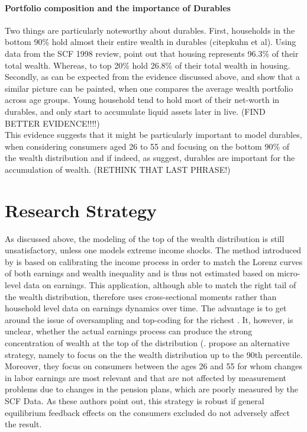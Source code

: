 \documentclass[a4paper,12pt]{article}
\begin{document}
\paragraph{Portfolio composition and the importance of Durables}
Two things are particularly noteworthy about durables. First, households in the bottom 90\% hold almost their entire wealth in durables (citep{kuhn et al}). Using data from the SCF 1998 review, \cite{diaz2010} point out that housing represents 96.3\% of their total wealth. Whereas, to top 20\% hold 26.8\% of their total wealth in housing. Secondly, as can be expected from the evidence discussed above, \cite{yang2009} and \cite{FV&K2011} show that a similar picture can be painted, when one compares the average wealth portfolio across age groups. Young household tend to hold most of their net-worth in durables, and only start to accumulate liquid assets later in live. (FIND BETTER EVIDENCE!!!!)
\\
This evidence suggests that it might be particularly important to model durables, when considering consumers aged 26 to 55 and focusing on the bottom 90\% of the wealth distribution and if indeed, as \cite{FV&K2011} suggest, durables are important for the accumulation of wealth. (RETHINK THAT LAST PHRASE!) 

\section{Research Strategy}
As discussed above, the modeling of the top of the wealth distribution is still unsatisfactory, unless one models extreme income shocks. The method introduced by \cite{castaneda2003} is based on calibrating the income process in order to match the Lorenz curves of both earnings and wealth inequality and is thus not estimated based on micro-level data on earnings. This application, although able to match the right tail of the wealth distribution, therefore uses cross-sectional moments rather than household level data on earnings dynamics over time. The advantage is to get around the issue of oversampling and top-coding for the richest \citep{heathcote2009quantitative}. It, however, is unclear, whether the actual earnings process can produce the strong concentration of wealth at the top of the distribution (\cite{denardi2017}. \cite{hintermaier2011} propose an alternative strategy, namely to focus on the the wealth distribution up to the 90th percentile. Moreover, they focus on consumers between the ages 26 and 55 for whom changes in labor earnings are most relevant  and that are not affected by measurement problems due to changes in the pension plans, which are poorly measured by the SCF Data. As these authors point out,  this strategy is robust if general equilibrium feedback effects on the consumers excluded do not adversely affect the result. 
\end{document}
